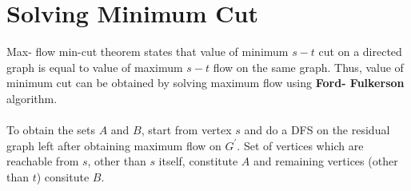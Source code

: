 \documentclass[twoside]{article}
\begin{document}
\section{Solving Minimum Cut}
Max- flow min-cut theorem states that value of minimum $s-t$ cut on a directed graph is equal to value of maximum $s-t$ flow on the same graph. Thus, value of minimum cut can be obtained by solving maximum flow using \textbf{Ford- Fulkerson} algorithm.\\\\
To obtain the sets $A$ and $B$, start from vertex $s$ and do a DFS on the residual graph left after obtaining maximum flow on $G^{'}$. Set of vertices which are reachable from $s$, other than $s$ itself, constitute $A$ and remaining vertices (other than $t$) consitute $B$.
\end{document}
